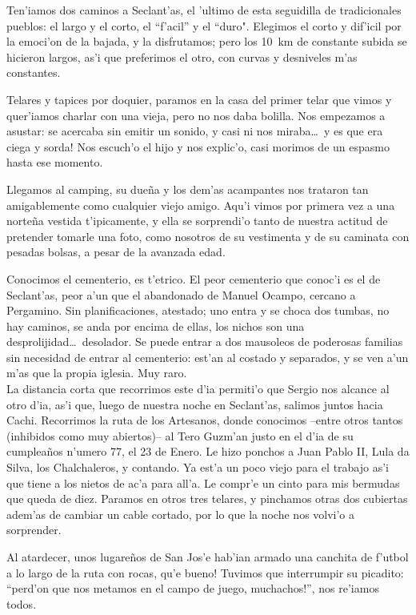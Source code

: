 Ten'iamos dos caminos a Seclant'as, el 'ultimo de esta seguidilla de
tradicionales pueblos: el largo y el corto, el ``f'acil'' y el ``duro". Elegimos
el corto y dif'icil por la emoci'on de la bajada, y la disfrutamos; pero los
10~km de constante subida se hicieron largos, as'i que preferimos el otro, con
curvas y desniveles m'as constantes.

Telares y tapices por doquier, paramos en la casa del primer telar que vimos y
quer'iamos charlar con una vieja, pero no nos daba bolilla. Nos empezamos a
asustar: se acercaba sin emitir un sonido, y casi ni nos miraba\ldots\
\textexclamdown y es que era ciega y sorda! Nos escuch'o el hijo y nos explic'o,
casi morimos de un espasmo hasta ese momento.

Llegamos al camping, su due\~na y los dem'as acampantes nos trataron tan
amigablemente como cualquier viejo amigo. Aqu'i vimos por primera vez a una
norte\~na vestida t'ipicamente, y ella se sorprendi'o tanto de nuestra actitud
de pretender tomarle una foto, como nosotros de su vestimenta y de su caminata
con pesadas bolsas, a pesar de la avanzada edad.

Conocimos el cementerio, es t'etrico. El peor cementerio que conoc'i es el de
Seclant'as, peor a'un que el abandonado de Manuel Ocampo, cercano a Pergamino.
Sin planificaciones, atestado; uno entra y se choca dos tumbas, no hay caminos,
se anda por encima de ellas, los nichos son una desprolijidad\ldots\ desolador.
Se puede entrar a dos mausoleos de poderosas familias sin necesidad de entrar al
cementerio: est'an al costado y separados, y se ven a'un m'as que la propia
iglesia. Muy raro.\\

La distancia corta que recorrimos este d'ia permiti'o que Sergio nos alcance al
otro d'ia, as'i que, luego de nuestra noche en Seclant'as, salimos juntos hacia
Cachi. Recorrimos la ruta de los Artesanos, donde conocimos --entre otros tantos
(inhibidos como muy abiertos)-- al Tero Guzm'an justo en el d'ia de su
cumplea\~nos n'umero 77, el 23 de Enero. Le hizo ponchos a Juan Pablo II, Lula
da Silva, los Chalchaleros, y contando. Ya est'a un poco viejo para el trabajo
as'i que tiene a los nietos de ac'a para all'a. Le compr'e un cinto para mis
bermudas que queda de diez. Paramos en otros tres telares, y pinchamos otras dos
cubiertas adem'as de cambiar un cable cortado, por lo que la noche nos volvi'o a
sorprender.

Al atardecer, unos lugare\~nos de San Jos'e hab'ian armado una canchita de
f'utbol a lo largo de la ruta con rocas, \textexclamdown qu'e bueno! Tuvimos que
interrumpir su picadito: ``\textexclamdown perd'on que nos metamos en el campo
de juego, muchachos!'', nos re'iamos todos.

